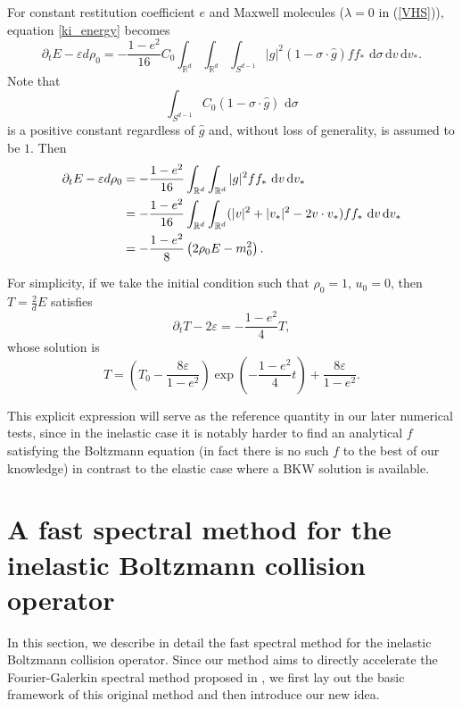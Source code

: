 \documentclass[review, times]{elsarticle}
\newcommand{\rd}{\,\mathrm{d}}
\begin{document}
For constant restitution coefficient $e$ and Maxwell molecules ($\lambda=0$ in (\ref{VHS})), equation \eqref{ki_energy} becomes
\begin{equation} 
\partial_t E -\varepsilon d\rho_0=-\frac{1-e^2}{16}C_0\int_{\mathbb{R}^d}\int_{\mathbb{R}^d}\int_{S^{d-1}}  |g|^{2}(1-\sigma\cdot \hat{g})ff_*\,\rd{\sigma}\rd{v}\rd{v_*}.
\end{equation}
Note that
\begin{equation}
\int_{S^{d-1}} C_0(1-\sigma\cdot \hat{g})\,\rd{\sigma}
\end{equation}
is a positive constant regardless of $\hat{g}$ and, without loss of generality, is assumed to be $1$. Then
\begin{align} 
  \partial_t E -\varepsilon d\rho_0 &=-\frac{1-e^2}{16}\int_{\mathbb{R}^d}\int_{\mathbb{R}^d} |g|^{2}ff_*\,\rd{v}\rd{v_*} \notag\\
   & =-\frac{1-e^2}{16}\int_{\mathbb{R}^d}\int_{\mathbb{R}^d} (|v|^2+|v_*|^2-2v\cdot v_*)ff_*\,\rd{v}\rd{v_*} \notag \\
   &=-\frac{1-e^2}{8}\left(2\rho_0E - m_0^2\right).
\end{align}

For simplicity, if we take the initial condition such that $\rho_0=1$, $u_0=0$, then $T=\frac{2}{d}E$ satisfies
\begin{equation}
\partial_t T-2\varepsilon =-\frac{1-e^2}{4}T,
\end{equation}
whose solution is
\begin{equation}\label{soln:T}
T=\left(T_0-\frac{8\varepsilon}{1-e^2}\right)\exp{\left(-\frac{1-e^2}{4}t\right)}+\frac{8\varepsilon}{1-e^2}.
\end{equation}

\begin{rmk}
This explicit expression will serve as the reference quantity in our later numerical tests, since in the inelastic case it is notably harder to find an analytical $f$ satisfying the Boltzmann equation (in fact there is no such $f$ to the best of our knowledge) in contrast to the elastic case where a BKW solution is available.
\end{rmk}


\section{A fast spectral method for the inelastic Boltzmann collision operator}

In this section, we describe in detail the fast spectral method for the inelastic Boltzmann collision operator. Since our method aims to directly accelerate the Fourier-Galerkin spectral method proposed in \cite{FPT05}, we first lay out the basic framework of this original method and then introduce our new idea.
\end{document}
